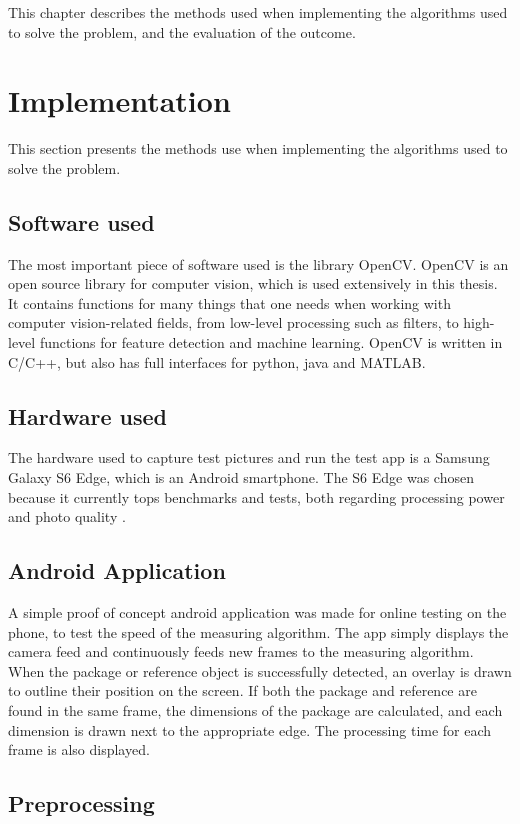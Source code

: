 This chapter describes the methods used when implementing the algorithms used to solve the problem, and the evaluation of the outcome.

\section{Implementation}
This section presents the methods use when implementing the algorithms used to solve the problem. %

\subsection{Software used}
The most important piece of software used is the library OpenCV. %
OpenCV is an open source library for computer vision, which is used extensively in this thesis. 
It contains functions for many things that one needs when working with computer vision-related fields, from low-level processing such as filters, to high-level functions for feature detection and machine learning.
OpenCV is written in C/C++, but also has full interfaces for python, java and MATLAB\cite{wiki:OpenCV}.
\subsection{Hardware used}
The hardware used to capture test pictures and run the test app is a Samsung Galaxy S6 Edge, which is an Android smartphone.
The S6 Edge was chosen because it currently tops benchmarks and tests, both regarding processing power and photo quality \cite{phone_performance_benchmark}\cite{phone_camera_benchmark}.

\subsection{Android Application}
A simple proof of concept android application was made for online testing on the phone, to test the speed of the measuring algorithm.
The app simply displays the camera feed and continuously feeds new frames to the measuring algorithm.
When the package or reference object is successfully detected, an overlay is drawn to outline their position on the screen.
If both the package and reference are found in the same frame, the dimensions of the package are calculated, and each dimension is drawn next to the appropriate edge.
The processing time for each frame is also displayed.

\subsection{Preprocessing}

